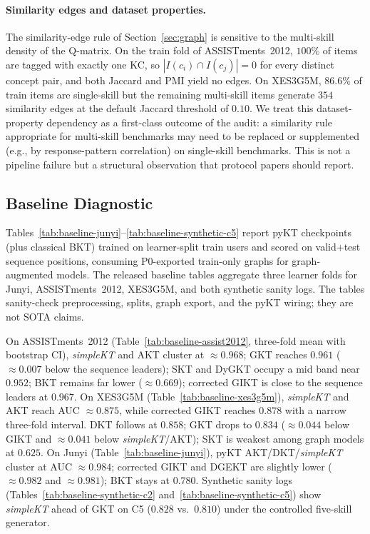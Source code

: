 \documentclass[runningheads]{llncs}
\begin{document}
\paragraph{Similarity edges and dataset properties.}
The similarity-edge rule of Section~\ref{sec:graph} is sensitive to the
multi-skill density of the Q-matrix. On the train fold of
ASSISTments~2012, $100\%$ of items are tagged with exactly one KC, so
$|I(c_i) \cap I(c_j)| = 0$ for every distinct concept pair, and both
Jaccard and PMI yield no edges. On XES3G5M, $86.6\%$ of train items are
single-skill but the remaining multi-skill items generate $354$
similarity edges at the default Jaccard threshold of $0.10$. We treat
this dataset-property dependency as a first-class outcome of the audit:
a similarity rule appropriate for multi-skill benchmarks may need to be
replaced or supplemented (e.g., by response-pattern correlation) on
single-skill benchmarks. This is not a pipeline failure but a structural
observation that protocol papers should report.
\subsection{Baseline Diagnostic}
\label{sec:exp-baseline}

Tables~\ref{tab:baseline-junyi}--\ref{tab:baseline-synthetic-c5} report
pyKT checkpoints (plus classical BKT) trained on learner-split train users and scored
on valid+test sequence positions, consuming P0-exported train-only graphs for
graph-augmented models. The released baseline tables aggregate three learner folds
for Junyi, ASSISTments~2012, XES3G5M, and both synthetic sanity logs.
The tables sanity-check preprocessing, splits, graph export, and the pyKT wiring;
they are not SOTA claims.

On ASSISTments~2012 (Table~\ref{tab:baseline-assist2012}, three-fold mean with bootstrap CI),
\textit{simpleKT} and AKT cluster at ${\approx}0.968$; GKT reaches $0.961$
(${\approx}0.007$ below the sequence leaders); SKT and DyGKT occupy a mid band near
$0.952$; BKT remains far lower (${\approx}0.669$); corrected GIKT is close to the
sequence leaders at $0.967$.
On XES3G5M (Table~\ref{tab:baseline-xes3g5m}),
\textit{simpleKT} and AKT reach AUC ${\approx}0.875$, while corrected GIKT reaches
$0.878$ with a narrow three-fold interval. DKT follows at $0.858$; GKT drops to $0.834$
(${\approx}0.044$ below GIKT and ${\approx}0.041$ below \textit{simpleKT}/AKT); SKT is
weakest among graph models at $0.625$.
On Junyi (Table~\ref{tab:baseline-junyi}), pyKT AKT/DKT/\textit{simpleKT} cluster
at AUC ${\approx}0.984$; corrected GIKT and DGEKT are slightly lower
(${\approx}0.982$ and ${\approx}0.981$); BKT stays at $0.780$.
Synthetic sanity logs (Tables~\ref{tab:baseline-synthetic-c2}
and~\ref{tab:baseline-synthetic-c5}) show \textit{simpleKT} ahead of GKT
on C5 ($0.828$ vs.\ $0.810$) under the controlled five-skill generator.
\end{document}
